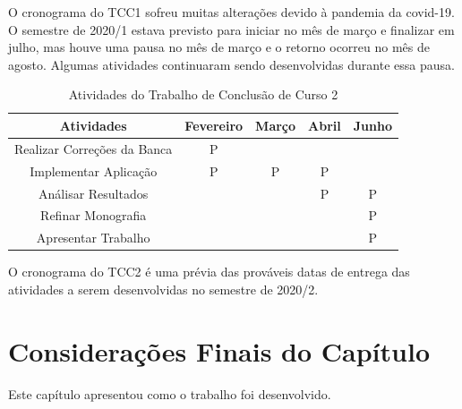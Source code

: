 O cronograma do TCC1 sofreu muitas alterações devido à pandemia da covid-19. O semestre de 2020/1 estava previsto para iniciar no mês de março e finalizar em julho, mas houve uma pausa no 
mês de março e o retorno ocorreu no mês de agosto. Algumas atividades continuaram sendo desenvolvidas durante essa pausa.



\begin{table}[h]
	\centering
	\caption{Atividades do Trabalho de Conclusão de Curso 2}
	\label{tab05}
	
	\begin{tabular}{ccccc}
		\toprule
		\textbf{Atividades} & \textbf{Fevereiro} & 
		\textbf{Março}  & \textbf{Abril}& \textbf{Junho}\\
		\midrule
		\begin{minipage} [t] {0.2\textwidth} \centering Realizar Correções da Banca \end{minipage} & P &  &  &  \\
		\midrule
		\begin{minipage} [t] {0.2\textwidth} \centering Implementar Aplicação \end{minipage} & P & P & P &  \\
		\midrule
		\begin{minipage} [t] {0.2\textwidth} \centering Análisar Resultados \end{minipage} &  &  &P &P  \\
		\midrule
		\begin{minipage} [t] {0.2\textwidth} \centering Refinar Monografia \end{minipage} &  &  &  & P \\
		\midrule
		\begin{minipage} [t] {0.2\textwidth} \centering Apresentar Trabalho \end{minipage} &  & & & P \\
		\bottomrule
	\end{tabular}
\end{table}

O cronograma do TCC2 é uma prévia das prováveis datas de entrega das atividades a serem desenvolvidas no semestre de 2020/2.

\section{Considerações Finais do Capítulo}

Este capítulo apresentou como o trabalho foi desenvolvido.

